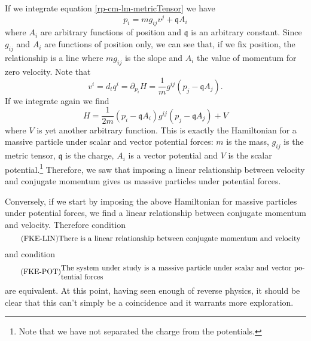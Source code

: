 If we integrate equation \ref{rp-cm-lm-metricTensor} we have
\begin{equation}
	p_i = m g_{ij} v^j + \mathfrak{q} A_i
\end{equation}
where $A_i$ are arbitrary functions of position and $\mathfrak{q}$ is an arbitrary constant. Since $g_{ij}$ and $A_i$ are functions of position only, we can see that, if we fix position, the relationship is a line where $mg_{ij}$ is the slope and $A_i$ the value of momentum for zero velocity. Note that
\begin{equation}
	v^i = d_t q^i = \partial_{p_i} H = \frac{1}{m} g^{ij}(p_j - \mathfrak{q} A_j).
\end{equation}
If we integrate again we find
\begin{equation}
	H = \frac{1}{2m}(p_i - \mathfrak{q} A_i)g^{ij}(p_j - \mathfrak{q} A_j) + V
\end{equation}
where $V$ is yet another arbitrary function. This is exactly the Hamiltonian for a massive particle under scalar and vector potential forces: $m$ is the mass, $g_{ij}$ is the metric tensor, $\mathfrak{q}$ is the charge, $A_i$ is a vector potential and $V$ is the scalar potential.\footnote{Note that we have not separated the charge from the potentials.} Therefore, we saw that imposing a linear relationship between velocity and conjugate momentum gives us massive particles under potential forces.

Conversely, if we start by imposing the above Hamiltonian for massive particles under potential forces, we find a linear relationship between conjugate momentum and velocity. Therefore condition
\begin{equation}\label{rp-cm-fke-condLinearRelationship}
	\tag{FKE-LIN}
	\eqtext{There is a linear relationship between conjugate momentum and velocity}
\end{equation}
and condition
\begin{equation}\label{rp-cm-fke-condMassiveParticle}
	\tag{FKE-POT}
	\eqtext{The system under study is a massive particle under scalar and vector potential forces}
\end{equation}
are equivalent. At this point, having seen enough of reverse physics, it should be clear that this can't simply be a coincidence and it warrants more exploration.

